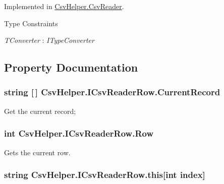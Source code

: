 Implemented in \hyperlink{a00055_a6665d63535ab6ca768ffbc76c1347e58}{Csv\-Helper.\-Csv\-Reader}.

\begin{Desc}
\item[Type Constraints]\begin{description}
\item[{\em T\-Converter} : {\em I\-Type\-Converter}]\end{description}
\end{Desc}


\subsection{Property Documentation}
\hypertarget{a00089_a4e8958e51331591b1d9e811e32bd92d0}{
\subsubsection[{Current\-Record}]{\setlength{\rightskip}{0pt plus 5cm}string \mbox{[}$\,$\mbox{]} Csv\-Helper.\-I\-Csv\-Reader\-Row.\-Current\-Record\hspace{0.3cm}{\ttfamily [get]}}}\label{a00089_a4e8958e51331591b1d9e811e32bd92d0}


Get the current record; 

\hypertarget{a00089_ac1bd960358282c70f0b85de90f00b446}{
\subsubsection[{Row}]{\setlength{\rightskip}{0pt plus 5cm}int Csv\-Helper.\-I\-Csv\-Reader\-Row.\-Row\hspace{0.3cm}{\ttfamily [get]}}}\label{a00089_ac1bd960358282c70f0b85de90f00b446}


Gets the current row. 

\hypertarget{a00089_a45d5b14c7382418d90b4c085c2bdc7dc}{
\subsubsection[{this[int index]}]{\setlength{\rightskip}{0pt plus 5cm}string Csv\-Helper.\-I\-Csv\-Reader\-Row.\-this\mbox{[}int index\mbox{]}\hspace{0.3cm}{\ttfamily [get]}}}\label{a00089_a45d5b14c7382418d90b4c085c2bdc7dc}



